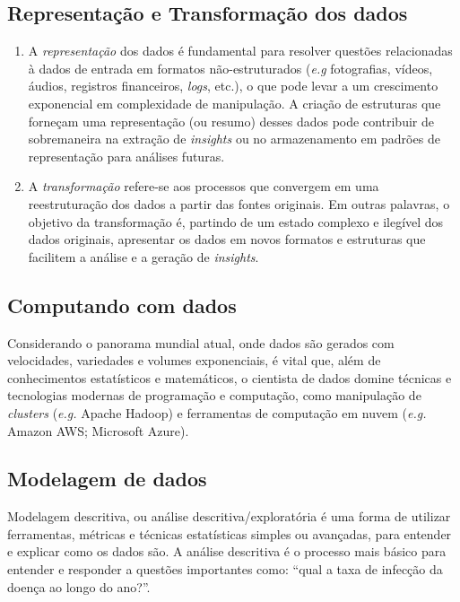 \subsection*{Representação e Transformação dos dados}

    \begin{enumerate}
        \item A \textit{representação} dos dados é fundamental para resolver questões relacionadas à dados de entrada em formatos não-estruturados (\textit{e.g} fotografias, vídeos, áudios, registros financeiros, \textit{logs}, etc.), o que pode levar a um crescimento exponencial em complexidade de manipulação. 
        A criação de estruturas que forneçam uma representação (ou resumo) desses dados pode contribuir de sobremaneira na extração de \textit{insights} ou no armazenamento em padrões de representação para análises futuras.
                  
        \item A \textit{transformação} refere-se aos processos que convergem em uma reestruturação dos dados a partir das fontes originais. 
        Em outras palavras, o objetivo da transformação é, partindo de um estado complexo e ilegível dos dados originais, apresentar os dados em novos formatos e estruturas que facilitem a análise e a geração de \textit{insights}.
        
    \end{enumerate}
        
\subsection*{Computando com dados}
Considerando o panorama mundial atual, onde dados são gerados com velocidades, variedades e volumes exponenciais, é vital que, além de conhecimentos estatísticos e matemáticos, o cientista de dados domine técnicas e tecnologias modernas de programação e computação, como manipulação de \textit{clusters} (\textit{e.g.} Apache Hadoop) e ferramentas de computação em nuvem (\textit{e.g.} Amazon AWS; Microsoft Azure).
    
\subsection*{Modelagem de dados}
Modelagem descritiva, ou análise descritiva/exploratória é uma forma de utilizar ferramentas, métricas e técnicas estatísticas simples ou avançadas, para entender e explicar como os dados são. A análise descritiva é o processo mais básico para entender e responder a questões importantes como: ``qual a taxa de infecção da doença ao longo do ano?''.

